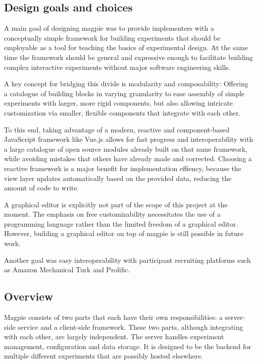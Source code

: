 \documentclass[a4paper,10pt]{paper}
\begin{document}
\subsection{Design goals and choices}
A main goal of designing magpie was to provide implementers with a conceptually simple framework for building experiments that should be employable as a tool for teaching the basics of experimental design. At the same time the framework should be general and expressive enough to facilitate building complex interactive experiments without major software engineering skills.

A key concept for bridging this divide is modularity and composability: Offering a catalogue of building blocks in varying granularity to ease assembly of simple experiments with larger, more rigid components, but also allowing intricate customization via smaller, flexible components that integrate with each other.

To this end, taking advantage of a modern, reactive and component-based JavaScript framework like Vue.js \citep{You2014} allows for fast progress and interoperability with a large catalogue of open source modules already built on that same framework, while avoiding mistakes that others have already made and corrected. Choosing a reactive framework is a major benefit for implementation effiency, because the view layer updates automatically based on the provided data, reducing the amount of code to write.

A graphical editor is explicitly not part of the scope of this project at the moment. The emphasis on free customizability necessitates the use of a programming language rather than the limited freedom of a graphical editor. However, building a graphical editor on top of magpie is still possible in future work.

Another goal was easy interoperability with participant recruiting platforms such as Amazon Mechanical Turk and Prolific.

\subsection{Overview}
Magpie consists of two parts that each have their own responsibilities: a server-side service and a client-side framework. These two parts, although integrating with each other, are largely independent. The server handles experiment management, configuration and data storage. It is designed to be the backend for multiple different experiments that are possibly hosted elsewhere.
\end{document}
